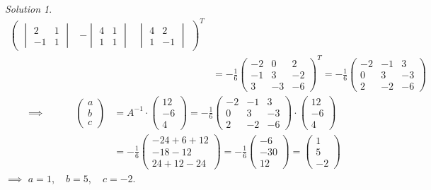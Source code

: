 \documentclass[
  12pt,
  oneside]{book}
\theoremstyle{definition}
\theoremstyle{definition}
\theoremstyle{definition}
\theoremstyle{definition}
\theoremstyle{remark}
\newtheorem*{solution}{Solution}
\begin{document}
\begin{solution}
\begin{align*}
\begin{pmatrix}
\begin{vmatrix}2&1\\-1&1\end{vmatrix}&-\begin{vmatrix}4&1\\1&1\end{vmatrix}&\begin{vmatrix}4&2\\1&-1\end{vmatrix}
\end{pmatrix}^T\\
&=-\frac{1}{6}\begin{pmatrix}
-2&0&2\\-1&3&-2\\3&-3&-6
\end{pmatrix}^T =
-\frac{1}{6}\begin{pmatrix}
-2&-1&3\\
0&3&-3\\
2&-2&-6
\end{pmatrix}
\end{align*}
\begin{align*}
\implies\quad\quad\quad
\begin{pmatrix}a\\b\\c\end{pmatrix} &=
A^{-1}\cdot \begin{pmatrix}12\\-6\\4\end{pmatrix}
= -\frac{1}{6}\begin{pmatrix}
-2&-1&3\\
0&3&-3\\
2&-2&-6
\end{pmatrix}\cdot \begin{pmatrix}12\\-6\\4\end{pmatrix}\\
&=-\frac{1}{6}\begin{pmatrix}-24+6+12\\-18-12\\24+12-24\end{pmatrix}
=-\frac{1}{6}\begin{pmatrix}-6\\-30\\12\end{pmatrix}
= \begin{pmatrix}1\\5\\-2\end{pmatrix}
\end{align*}
\(\implies\) \(a=1\), ~ \(b=5\), ~ \(c=-2\).
\end{solution}
\end{document}
